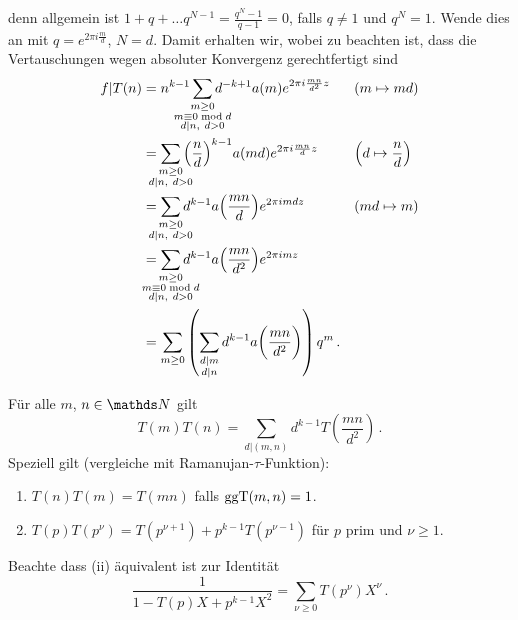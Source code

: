 \begin{bewe-list}
denn allgemein ist $1+q+\ldots q^{N-1} = \frac{q^N-1}{q-1} = 0$, falls $q\not=1$ und $q^N = 1$. Wende dies an mit $q=e^{2\pi i \frac{m}{d}}$, $N=d$.
Damit erhalten wir, wobei zu beachten ist, dass die Vertauschungen wegen absoluter Konvergenz gerechtfertigt sind
\begin{align*}
f|T(n)
&= n^{k-1} \smashoperator{\sum_{\substack{m \geq 0 \\ m \equiv 0 \bmod d \\ d|n,\ d > 0}}} d^{-k+1} a(m) e^{2\pi i\frac{mn}{d^2}z} &&(m\mapsto md) \\
&= \smashoperator{\sum_{\substack{m \geq 0\\ d|n,\ d>0}}} \, \Bigl(\frac{n}{d}\Bigr)^{k-1} a(md) e^{2\pi i \frac{mn}{d}z} &&\Bigl(d\mapsto\frac{n}{d}\Bigr) \\
&= \smashoperator{\sum_{\substack{m \geq 0 \\ d|n,\ d>0}}} d^{k-1} a\Bigl(\frac{mn}{d}\Bigr) e^{2\pi imdz} && (md\mapsto m) \\
&= \smashoperator{\sum_{\substack{m\geq 0 \\ m\equiv 0 \bmod d \\ d|n,\ d>0}}} d^{k-1} a\Bigl(\frac{mn}{d^2}\Bigr) e^{2\pi imz} \\
&= \sum_{m\geq 0} \left(\sum_{\substack{d|m\\d|n}} d^{k-1} a\biggl(\frac{mn}{d^2}\biggr)\right) q^m
\,.
\end{align*}
\end{bewe-list}

\begin{satz}\label{TmTn}
	Für alle $m$, $n \in \NN$ gilt
	\[
	T(m) T(n) = \sum_{d | (m,n)} d^{k-1} T \left( \frac {mn}{d^2} \right)
	\,.
	\]
	Speziell gilt (vergleiche mit Ramanujan-$\tau$-Funktion):
	\begin{enumerate}
		\item $T(n)T(m) = T(mn)$ falls $\operatorname{ggT}(m,n) = 1$.
		\item $T(p) T(p^\nu) = T(p^{\nu+1}) + p^{k-1} T(p^{\nu-1})$ für $p$ prim und $\nu \geq 1$.
	\end{enumerate}
	
	Beachte dass (ii) äquivalent ist zur Identität
	\[
	\frac{1}{1-T(p)X+p^{k-1}X^2} = \sum_{\nu \geq 0} T(p^\nu) X^\nu
	\,.
	\]
\end{satz}

